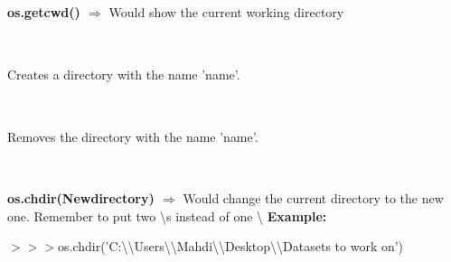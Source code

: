 \documentclass[a4paper,18pt]{article}
\begin{document}

\subsection{\colorbox {matgreen}{\color{white}{\large os.getcwd()}}}
\textbf{os.getcwd() $\Rightarrow$} Would show the current working directory\\\\


\subsection{\colorbox {matgreen}{\color{white}{\large os.mkdir('name')}}}
Creates a directory with the name 'name'.\\\\


\subsection{\colorbox {matgreen}{\color{white}{\large os.removedirs('name')}}}
Removes the directory with the name 'name'.\\\\


\subsection{\colorbox {matgreen}{\color{white}{\large os.chdir(Newdirectory)}}}
\textbf{os.chdir(Newdirectory) $\Rightarrow$} Would change the current directory to the new one. Remember to put two \textbackslash s instead of one \textbackslash
\textbf{Example:\\}

$>>>$os.chdir('C:\textbackslash\textbackslash Users\textbackslash\textbackslash Mahdi\textbackslash\textbackslash Desktop\textbackslash\textbackslash Datasets to work on')\\
\end{document}
